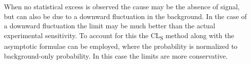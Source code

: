 %
%

When no statistical excess is observed the cause may be the absence of signal, but can also be due to a downward fluctuation in the background.  In the case of a downward fluctuation the limit may be much better than the actual experimental sensitivity.  To account for this the CL\textsubscript{S} method\cite{CLs1, CLs2} along with the asymptotic formulae\cite{likelihoodFit} can be employed, where the probability is normalized to background-only probability.  In this case the limits are more conservative. \\ %



